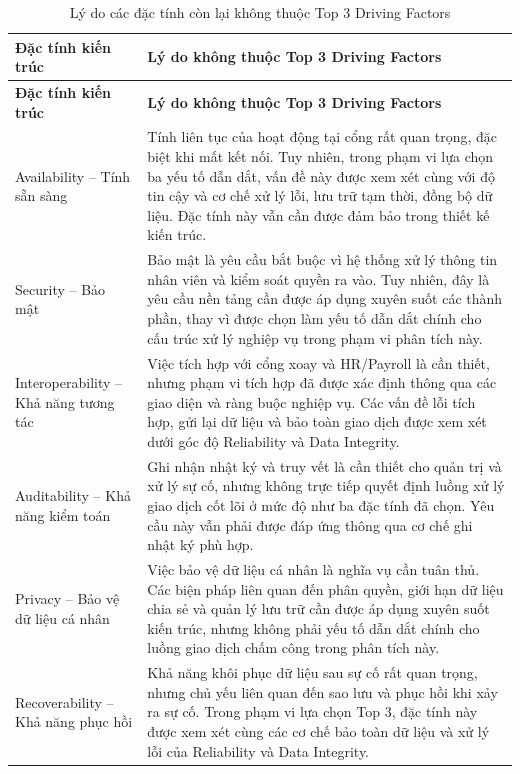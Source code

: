 \small
\renewcommand{\arraystretch}{1.3}
\begin{longtable}{|>{\raggedright\arraybackslash}p{4.2cm}|>{\raggedright\arraybackslash}p{10.7cm}|}
\caption{Lý do các đặc tính còn lại không thuộc Top 3 Driving Factors}\label{tab:non-top3} \\
\hline
\textbf{Đặc tính kiến trúc} & \textbf{Lý do không thuộc Top 3 Driving Factors} \\
\hline
\endfirsthead
\hline
\textbf{Đặc tính kiến trúc} & \textbf{Lý do không thuộc Top 3 Driving Factors} \\
\hline
\endhead
\hline
\endfoot
\hline
\endlastfoot
Availability -- Tính sẵn sàng & Tính liên tục của hoạt động tại cổng rất quan trọng, đặc biệt khi mất kết nối. Tuy nhiên, trong phạm vi lựa chọn ba yếu tố dẫn dắt, vấn đề này được xem xét cùng với độ tin cậy và cơ chế xử lý lỗi, lưu trữ tạm thời, đồng bộ dữ liệu. Đặc tính này vẫn cần được đảm bảo trong thiết kế kiến trúc. \\
\hline
Security -- Bảo mật & Bảo mật là yêu cầu bắt buộc vì hệ thống xử lý thông tin nhân viên và kiểm soát quyền ra vào. Tuy nhiên, đây là yêu cầu nền tảng cần được áp dụng xuyên suốt các thành phần, thay vì được chọn làm yếu tố dẫn dắt chính cho cấu trúc xử lý nghiệp vụ trong phạm vi phân tích này. \\
\hline
Interoperability -- Khả năng tương tác & Việc tích hợp với cổng xoay và HR/Payroll là cần thiết, nhưng phạm vi tích hợp đã được xác định thông qua các giao diện và ràng buộc nghiệp vụ. Các vấn đề lỗi tích hợp, gửi lại dữ liệu và bảo toàn giao dịch được xem xét dưới góc độ Reliability và Data Integrity. \\
\hline
Auditability -- Khả năng kiểm toán & Ghi nhận nhật ký và truy vết là cần thiết cho quản trị và xử lý sự cố, nhưng không trực tiếp quyết định luồng xử lý giao dịch cốt lõi ở mức độ như ba đặc tính đã chọn. Yêu cầu này vẫn phải được đáp ứng thông qua cơ chế ghi nhật ký phù hợp. \\
\hline
Privacy -- Bảo vệ dữ liệu cá nhân & Việc bảo vệ dữ liệu cá nhân là nghĩa vụ cần tuân thủ. Các biện pháp liên quan đến phân quyền, giới hạn dữ liệu chia sẻ và quản lý lưu trữ cần được áp dụng xuyên suốt kiến trúc, nhưng không phải yếu tố dẫn dắt chính cho luồng giao dịch chấm công trong phân tích này. \\
\hline
Recoverability -- Khả năng phục hồi & Khả năng khôi phục dữ liệu sau sự cố rất quan trọng, nhưng chủ yếu liên quan đến sao lưu và phục hồi khi xảy ra sự cố. Trong phạm vi lựa chọn Top 3, đặc tính này được xem xét cùng các cơ chế bảo toàn dữ liệu và xử lý lỗi của Reliability và Data Integrity. \\

\end{longtable}
